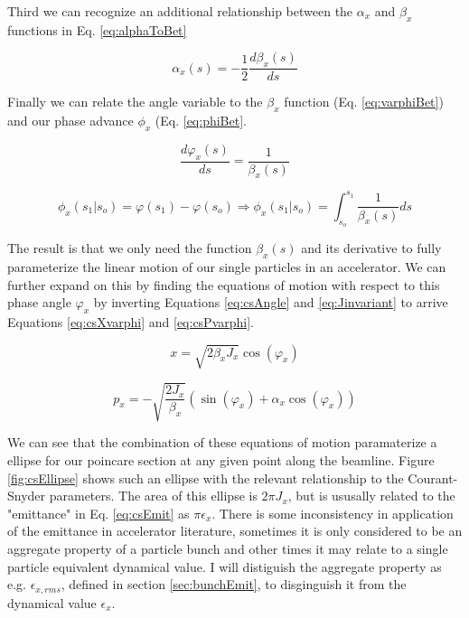 Third we can recognize an additional relationship between the $\alpha_x$ and $\beta_x$ functions in Eq. \ref{eq:alphaToBet}

\begin{equation} \label{eq:alphaToBet}
	\alpha_x(s) = -\frac{1}{2}\frac{d\beta_x(s)}{ds}
\end{equation}

Finally we can relate the angle variable to the $\beta_x$ function (Eq. \ref{eq:varphiBet}) and our phase advance $\phi_x$ (Eq. \ref{eq:phiBet}.

\begin{equation} \label{eq:varphiBet}
	\frac{d\varphi_x(s)}{ds} = \frac{1}{\beta_x(s)}
\end{equation}

\begin{equation} \label{eq:phiBet}
	\phi_x(s_1|s_o) = \varphi(s_1) - \varphi(s_o) \Rightarrow \phi_x(s_1|s_o) = \int_{s_o}^{s_1} \frac{1}{\beta_x(s)} ds
\end{equation}

The result is that we only need the function $\beta_x(s)$ and its derivative to fully parameterize the linear motion of our single particles in an accelerator. We can further expand on this by finding the equations of motion with respect to this phase angle $\varphi_x$ by inverting Equations \ref{eq:csAngle} and \ref{eq:Jinvariant} to arrive Equations \ref{eq:csXvarphi} and \ref{eq:csPvarphi}.

\begin{equation} \label{eq:csXvarphi}
	x = \sqrt{2 \beta_x J_x} \cos{(\varphi_x)}
\end{equation}

\begin{equation} \label{eq:csPvarphi}
	p_x = -\sqrt{\frac{2 J_x}{\beta_x}} (\sin{(\varphi_x)} + \alpha_x \cos{(\varphi_x)})
\end{equation}

We can see that the combination of these equations of motion paramaterize a ellipse for our poincare section at any given point along the beamline. Figure \ref{fig:csEllipse} shows such an ellipse with the relevant relationship to the Courant-Snyder parameters. The area of this ellipse is $2\pi J_x$, but is ususally related to the "emittance" in Eq. \ref{eq:csEmit} as $\pi \epsilon_x$. There is some inconsistency in application of the emittance in accelerator literature, sometimes it is only considered to be an aggregate property of a particle bunch and other times it may relate to a single particle equivalent dynamical value. I will distiguish the aggregate property as e.g. $\epsilon_{x,rms}$, defined in section \ref{sec:bunchEmit}, to disginguish it from the dynamical value $\epsilon_x$.

